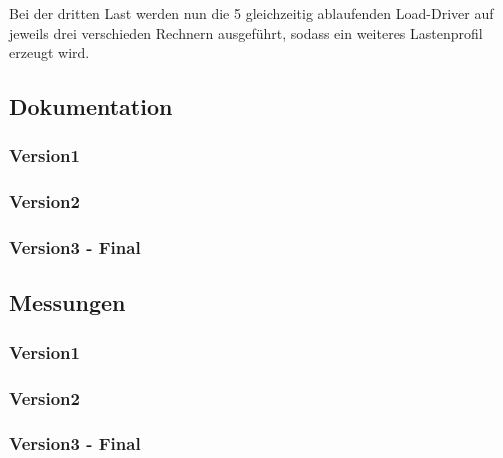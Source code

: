 Bei der dritten Last werden nun die 5 gleichzeitig ablaufenden Load-Driver auf jeweils drei verschieden Rechnern ausgeführt, sodass ein weiteres Lastenprofil erzeugt wird.
\subsection{Dokumentation}\label{subsec:dokumentation-last3}
\subsubsection{Version1}
\subsubsection{Version2}
\subsubsection{Version3 - Final}

\subsection{Messungen}\label{subsec:messungen-last3}
\subsubsection{Version1}
\subsubsection{Version2}
\subsubsection{Version3 - Final}